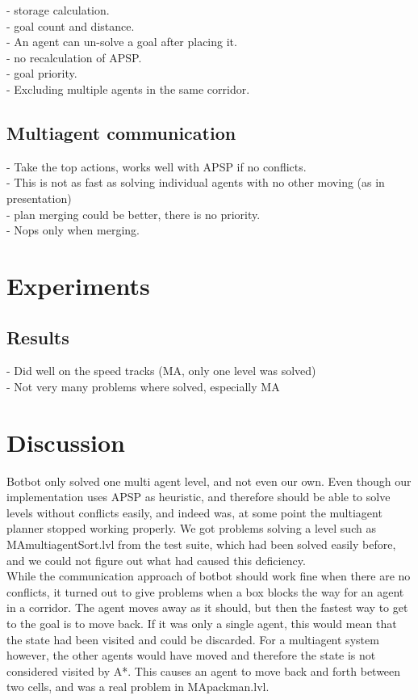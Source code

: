 \documentclass[letterpaper]{article}
\begin{document}
- storage calculation.\\
- goal count and distance.\\
- An agent can un-solve a goal after placing it.\\
- no recalculation of APSP.\\
- goal priority.\\
- Excluding multiple agents in the same corridor.\\ 
\subsection{Multiagent communication}
- Take the top actions, works well with APSP if no conflicts.\\
- This is not as fast as solving individual agents with no other moving (as in presentation)\\
- plan merging could be better, there is no priority.\\
- Nops only when merging.\\
\section{Experiments}
\subsection{Results}
- Did well on the speed tracks (MA, only one level was solved)\\
- Not very many problems where solved, especially MA\\
\section{Discussion}
Botbot only solved one multi agent level, and not even our own. Even though our
implementation uses APSP as heuristic, and therefore should be able to solve
levels without conflicts easily, and indeed was, at some point the multiagent
planner stopped working properly. We got problems solving a level such as MAmultiagentSort.lvl
from the test suite, which had been solved easily before, and we could not
figure out what had caused this deficiency.\\

While the communication approach of botbot should work fine when there are
no conflicts, it turned out to give problems when a box blocks the way for
an agent in a corridor. The agent moves away as it should, but then the fastest
way to get to the goal is to move back. If it was only a single agent, this would
mean that the state had been visited and could be discarded. For a multiagent system
however, the other agents would have moved and therefore the state is not considered
visited by A*. This causes an agent to move back and forth between two cells, and
was a real problem in MApackman.lvl.
\end{document}
